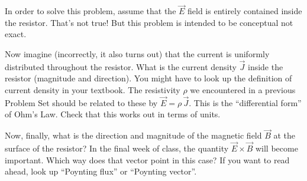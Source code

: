 \documentclass[12pt]{article}
\begin{document}
In order to solve this problem, assume that the $\vec{E}$ field is entirely
contained inside the resistor. That's not true! But this problem is intended
to be conceptual not exact.

Now imagine (incorrectly, it also turns out) that the current is uniformly distributed
throughout the resistor. What is the current density $\vec{J}$ inside the
resistor (magnitude and direction). You might have to look up the definition
of current density in your textbook. The resistivity $\rho$ we encountered in a
previous Problem Set should be related to these by $\vec{E}=\rho\,\vec{J}$.
This is the ``differential form'' of Ohm's Law.
Check that this works out in terms of units.

Now, finally, what is the direction and magnitude of the magnetic field $\vec{B}$
at the surface of the resistor? In the final week of class, the quantity
$\vec{E}\times\vec{B}$ will become important. Which way does that vector point in
this case? If you want to read ahead, look up ``Poynting flux'' or ``Poynting vector''.
\end{document}
